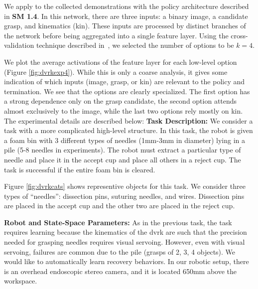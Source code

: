 We apply \alg to the collected demonstrations with the policy architecture described in \textbf{SM 1.4}. In this network, there are three inputs: a binary \textsf{image}, a candidate \textsf{grasp}, and kinematics (\textsf{kin}). These inputs are processed by distinct branches of the network before being aggregated into a single feature layer.  Using the cross-validation technique described in~, we selected the number of options to be $k=4$.

We plot the average activations of the feature layer for each low-level option (Figure \ref{fig:dvrkexp4}). While this is only a coarse analysis, it gives some indication of which inputs (\textsf{image}, \textsf{grasp}, or \textsf{kin}) are relevant to the policy and termination. We see that the options are clearly specialized. The first option has a strong dependence only on the \textsf{grasp} candidate, the second option attends almost exclusively to the \textsf{image}, while the last two options rely mostly on \textsf{kin}.
The experimental details are described below:
\vspace{0.5em} \noindent \textbf{Task Description: } We consider a task with a more complicated high-level structure.
In this task, the robot is given a foam bin with 3 different types of needles (1mm-3mm in diameter) lying in a pile (5-8 needles in experiments).
The robot must extract a particular type of needle  and place it in the accept cup and place all others in a reject cup.
The task is successful if the entire foam bin is cleared.

Figure \ref{fig:dvrkcats} shows representive objects for this task. We consider three types of ``needles'': dissection pins, suturing needles, and wires.
Dissection pins are placed in the accept cup and the other two are placed in the reject cup.


\vspace{0.5em} \noindent \textbf{Robot and State-Space Parameters: } As in the previous task, the task requires learning because the kinematics of the dvrk are such that the precision needed for grasping needles requires visual servoing.
However, even with visual servoing, failures are common due to the pile (grasps of 2, 3, 4 objects).
We would like to automatically learn recovery behaviors. 
In our robotic setup, there is an overhead endoscopic stereo camera, and it is located 650mm above the workspace.

